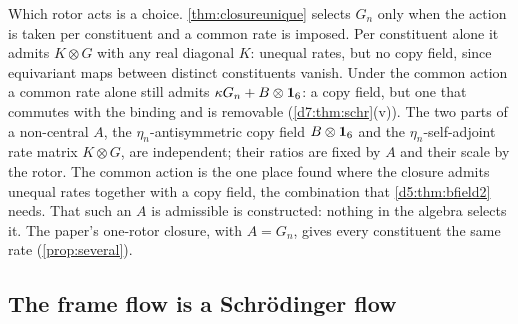 Which rotor acts is a choice. \cref{thm:closureunique} selects $G_n$ only when the action is taken per constituent and a common rate is
imposed. Per constituent alone it admits $K\otimes G$ with any real diagonal $K$: unequal rates, but no copy field, since equivariant maps between
distinct constituents vanish. Under the common action a common rate alone still admits $\kappa G_n+B\otimes\mathbf 1_6$: a copy field, but one that commutes
with the binding and is removable (\cref{d7:thm:schr}(v)). The two parts of a non-central $A$, the $\eta_n$-antisymmetric copy field
$B\otimes\mathbf 1_6$ and the $\eta_n$-self-adjoint rate matrix $K\otimes G$, are independent; their ratios are fixed by $A$ and their scale by the rotor.
The common action is the one place found where the closure admits unequal rates together with a copy field, the combination that
\cref{d5:thm:bfield2} needs. That such an $A$ is admissible is constructed: nothing in the algebra selects it. The paper's one-rotor closure, with
$A=G_n$, gives every constituent the same rate (\cref{prop:several}).

\subsection{The frame flow is a Schr\"odinger flow}
\label{d7:sec:schr}

